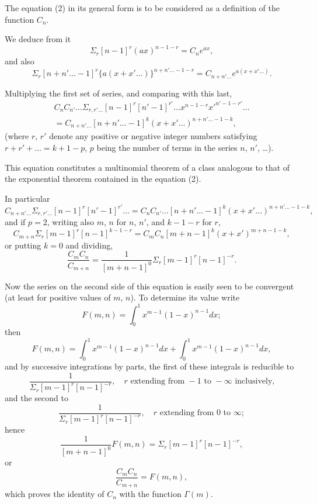 \documentclass[11pt,a4paper]{article}
\theoremstyle{plain}
\begin{document}
The equation (2) in its general form is to be considered as a definition of the function $C_n$.

We deduce from it
\[\Sigma_r [n-1]^r (ax)^{n-1-r} = C_n e^{ax},\]
and also
\[\Sigma_r [n+n'\ldots-1]^r \{a(x+x'\ldots)\}^{n+n'\ldots-1-r} = C_{n+n'\ldots} e^{a(x+x'\ldots)}.\]

Multiplying the first set of series, and comparing with this last,
\begin{multline}
C_n C_{n'}\ldots \Sigma_{r,r'\ldots} [n-1]^r [n'-1]^{r'}\ldots x^{n-1-r} x'^{n'-1-r'}\ldots \\ = C_{n+n'\ldots} [n+n'\ldots-1]^k (x+x'\ldots)^{n+n'\ldots-1-k},\tag{3}\end{multline}
(where $r$, $r'$ denote any positive or negative integer numbers satisfying $r + r' + \ldots = k + 1 - p$, $p$ being the number of terms in the series $n$, $n'$, \ldots).

This equation constitutes a multinomial theorem of a class analogous to that of the exponential theorem contained in the equation (2).

In particular
\begin{equation}C_{n+n'\ldots} \Sigma_{r,r'\ldots} [n-1]^r [n'-1]^{r'}\ldots = C_n C_{n'}\ldots [n+n'\ldots-1]^k (x+x'\ldots)^{n+n'\ldots-1-k},\tag{4}\end{equation}
and if $p=2$, writing also $m$, $n$ for $n$, $n'$, and $k-1-r$ for $r$,
\begin{equation}C_{m+n} \Sigma_r [m-1]^r [n-1]^{k-1-r} = C_m C_n [m+n-1]^k (x+x')^{m+n-1-k},\tag{5}\end{equation}
or putting $k=0$ and dividing,
\begin{equation}\frac{C_m C_n}{C_{m+n}} = \frac{1}{[m+n-1]^0} \Sigma_r [m-1]^r [n-1]^{-r}.\tag{6}\end{equation}

Now the series on the second side of this equation is easily seen to be convergent (at least for positive values of $m$, $n$). To determine its value write
\[F(m,n) = \int_0^1 x^{m-1} (1-x)^{n-1} dx;\]
then
\[F(m,n) = \int_0^1 x^{m-1} (1-x)^{n-1} dx + \int_0^1 x^{m-1} (1-x)^{n-1} dx,\]
and by successive integrations by parts, the first of these integrals is reducible to
\[\frac{1}{\Sigma_r [m-1]^r [n-1]^{-r}}, \quad r \text{ extending from } -1 \text{ to } -\infty \text{ inclusively,}\]
and the second to
\[\frac{1}{\Sigma_r [m-1]^r [n-1]^{-r}}, \quad r \text{ extending from } 0 \text{ to } \infty;\]
hence
\[\frac{1}{[m+n-1]^0} F(m,n) = \Sigma_r [m-1]^r [n-1]^{-r},\]
or
\begin{equation}\frac{C_m C_n}{C_{m+n}} = F(m,n),\tag{7}\end{equation}
which proves the identity of $C_n$ with the function $\Gamma(m)$.
\end{document}

